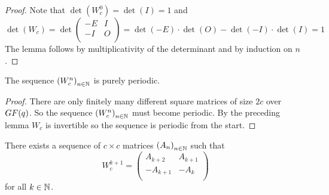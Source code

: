 \begin{proof}
  Note that $\det(W_{c}^{0}) = \det(I) = 1$ and
  \[
  \det(W_{c}) = \det
  \left(
  \begin{array}{cc}
    -E & I \\
    -I & O \\
  \end{array}
  \right)
  =
  \det(-E) \cdot \det(O) - \det(-I) \cdot \det(I)
  =
  1
  \]
  The lemma follows by multiplicativity of the determinant and
  by induction on $n$.
\end{proof}

\begin{theorem}
  The sequence $\left(W_{c}^{n}\right)_{n\in\mathbb{N}}$ is purely periodic.
\end{theorem}

\begin{proof}
  There are only finitely many different square matrices of size $2c$ over
  $GF(q)$. So the sequence $\left(W_{c}^{n}\right)_{n\in\mathbb{N}}$ must
  become periodic. By the preceding lemma $W_{c}$ is invertible so the
  sequence is periodic from the start.
\end{proof}

\begin{lemma}[$W$-structure]
  There exists a sequence of $c \times c$ matrices
  $\left(A_{n}\right)_{n\in\mathbb{N}}$ such that
  \[
  W_{c}^{k+1}
  =
  \left(
  \begin{array}{cc}
     A_{k+2} &  A_{k+1} \\
    -A_{k+1} & -A_{k}   \\
  \end{array}
  \right)
  \]
  for all $k\in\mathbb{N}$.
\end{lemma}

